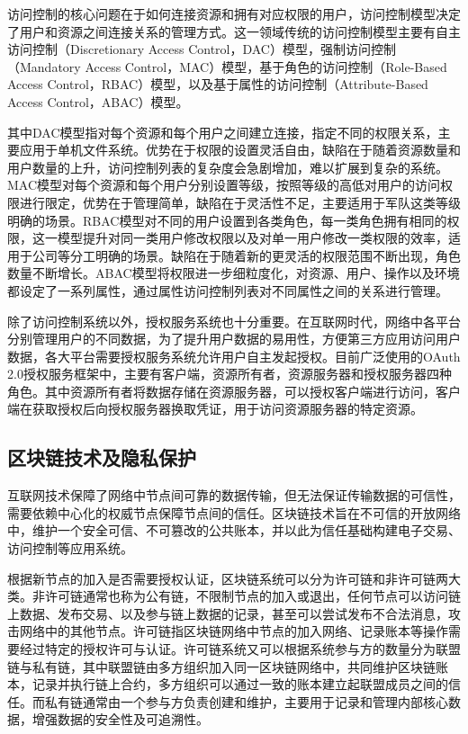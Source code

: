 访问控制的核心问题在于如何连接资源和拥有对应权限的用户，访问控制模型决定了用户和资源之间连接关系的管理方式。这一领域传统的访问控制模型主要有自主访问控制（Discretionary Access Control，DAC）模型，强制访问控制（Mandatory Access Control，MAC）模型，基于角色的访问控制（Role-Based Access Control，RBAC）模型，以及基于属性的访问控制（Attribute-Based Access Control，ABAC）模型。

其中DAC模型指对每个资源和每个用户之间建立连接，指定不同的权限关系，主要应用于单机文件系统。优势在于权限的设置灵活自由，缺陷在于随着资源数量和用户数量的上升，访问控制列表的复杂度会急剧增加，难以扩展到复杂的系统。MAC模型对每个资源和每个用户分别设置等级，按照等级的高低对用户的访问权限进行限定，优势在于管理简单，缺陷在于灵活性不足，主要适用于军队这类等级明确的场景。RBAC模型对不同的用户设置到各类角色，每一类角色拥有相同的权限，这一模型提升对同一类用户修改权限以及对单一用户修改一类权限的效率，适用于公司等分工明确的场景。缺陷在于随着新的更灵活的权限范围不断出现，角色数量不断增长。ABAC模型将权限进一步细粒度化，对资源、用户、操作以及环境都设定了一系列属性，通过属性访问控制列表对不同属性之间的关系进行管理。

除了访问控制系统以外，授权服务系统也十分重要。在互联网时代，网络中各平台分别管理用户的不同数据，为了提升用户数据的易用性，方便第三方应用访问用户数据，各大平台需要授权服务系统允许用户自主发起授权。目前广泛使用的OAuth 2.0授权服务框架中，主要有客户端，资源所有者，资源服务器和授权服务器四种角色。其中资源所有者将数据存储在资源服务器，可以授权客户端进行访问，客户端在获取授权后向授权服务器换取凭证，用于访问资源服务器的特定资源。

\subsection{区块链技术及隐私保护}

互联网技术保障了网络中节点间可靠的数据传输，但无法保证传输数据的可信性，需要依赖中心化的权威节点保障节点间的信任。区块链技术旨在不可信的开放网络中，维护一个安全可信、不可篡改的公共账本，并以此为信任基础构建电子交易、访问控制等应用系统。

根据新节点的加入是否需要授权认证，区块链系统可以分为许可链和非许可链两大类。非许可链通常也称为公有链，不限制节点的加入或退出，任何节点可以访问链上数据、发布交易、以及参与链上数据的记录，甚至可以尝试发布不合法消息，攻击网络中的其他节点。许可链指区块链网络中节点的加入网络、记录账本等操作需要经过特定的授权许可与认证。许可链系统又可以根据系统参与方的数量分为联盟链与私有链，其中联盟链由多方组织加入同一区块链网络中，共同维护区块链账本，记录并执行链上合约，多方组织可以通过一致的账本建立起联盟成员之间的信任。而私有链通常由一个参与方负责创建和维护，主要用于记录和管理内部核心数据，增强数据的安全性及可追溯性。

